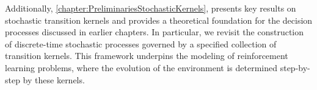 \documentclass[
    a4paper,
    11pt,
    bibliography=totoc,
    listof=totoc,      
    headinclude=true,
    cleardoublepage=empty,
]{scrbook}
\theoremstyle{plain}
\theoremstyle{definition}
\theoremstyle{remark}
\begin{document}
Additionally, \cref{chapter:PreliminariesStochasticKernels}, presents key results 
on stochastic transition kernels and provides a theoretical foundation for the 
decision processes discussed in earlier chapters. In particular, we revisit 
the construction of discrete-time stochastic processes governed by a specified 
collection of transition kernels. This framework underpins the modeling of 
reinforcement learning problems, where the evolution of the environment is 
determined step-by-step by these kernels.

\end{document}
